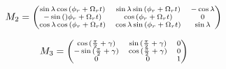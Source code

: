 \documentclass{ttuthes2007}
\begin{document}
\begin{equation}
\scriptsize
M_2=
\begin{pmatrix}
\sin{\lambda}\cos{(\phi_r+\Omega_rt)} & \sin{\lambda}\sin{(\phi_r+\Omega_rt)} 
& -\cos{\lambda}\\
-\sin{()\phi_r+\Omega_rt)} & \cos{(\phi_r+\Omega_rt)} & 0\\
\cos{\lambda}\cos{(\phi_r+\Omega_rt)}  & \cos{\lambda}\sin{(\phi_r+\Omega_rt)} 
& \sin{\lambda}
\end{pmatrix}
\end{equation}

\begin{equation}
\scriptsize
M_3=
\begin{pmatrix}
\cos{(\frac{\pi}{2}+\gamma)} & \sin{(\frac{\pi}{2}+\gamma)} & 0\\
-\sin{(\frac{\pi}{2}+\gamma)} & \cos{(\frac{\pi}{2}+\gamma)} & 0\\
0 & 0 & 1
\end{pmatrix}
\end{equation}
\end{document}
